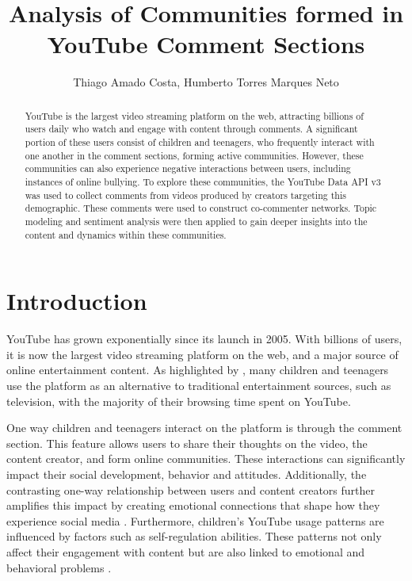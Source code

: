 \documentclass[12pt]{article}
\title{Analysis of Communities formed in YouTube Comment Sections}
\author{Thiago Amado Costa\inst{1}, Humberto Torres Marques Neto\inst{1}}
\begin{document}
\maketitle

\begin{abstract}
    YouTube is the largest video streaming platform on the web, attracting billions of users 
    daily who watch and engage with content through comments. 
    A significant portion of these users consist of children and teenagers, who frequently interact 
    with one another in the comment sections, forming active communities. 
    However, these communities can also experience negative interactions between users, 
    including instances of online bullying.
    To explore these communities, the YouTube Data API v3 was used to collect comments 
    from videos produced by creators targeting this demographic. These comments were used to construct 
    co-commenter networks.
    Topic modeling and sentiment analysis were then applied to gain deeper insights into the  
    content and dynamics within these communities.
\end{abstract}

\section{Introduction}

YouTube has grown exponentially since its launch in 2005. With billions of users, it is now the 
largest video streaming platform on the web, and a major source of online entertainment content. 
As highlighted by \cite{app13064044}, many children and teenagers use the platform as an alternative to 
traditional entertainment sources, such as television, with the majority of their 
browsing time spent on YouTube. 

One way children and teenagers interact on the platform is through the comment section. 
This feature allows users to share their thoughts on the video, the content creator, and form online 
communities. These interactions can significantly impact their social development, behavior and 
attitudes. Additionally, the contrasting one-way relationship between users and content creators 
further amplifies this impact by creating emotional connections that shape how they experience social
media \cite{lozano2023social}. 
Furthermore, children's YouTube usage patterns are influenced by factors such as self-regulation 
abilities. These patterns not only affect their engagement with content but are also linked to 
emotional and behavioral problems \cite{kim2024temperament} .
\end{document}
